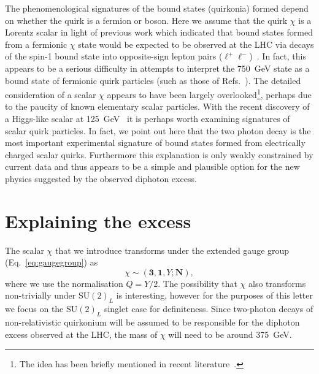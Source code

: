 The phenomenological signatures of the bound states (quirkonia) formed depend on
whether the quirk is a fermion or boson. Here we assume that the quirk $\chi$ is
a Lorentz scalar in light of previous work which indicated that bound states
formed from a fermionic $\chi$ state would be expected to be observed at the LHC
via decays of the spin-1 bound state into opposite-sign lepton pairs
($\ell^+\ell^-$)~\cite{Carlson:1991zn, Clarke:2011aa}. In fact, this appears to
be a serious difficulty in attempts to interpret the \SI{750}{\GeV} state as a
bound state of fermionic quirk particles (such as those of
Refs.~\cite{Kats:2016kuz, Curtin:2015jcv, Kamenik:2016izk}). The detailed
consideration of a scalar $\chi$ appears to have been largely
overlooked\footnote{The idea has been briefly mentioned in recent
  literature~\cite{Agrawal:2015dbf, Ko:2016sht}.}, perhaps due to the paucity of
known elementary scalar particles. With the recent discovery of a Higgs-like
scalar at \SI{125}{\GeV}~\cite{Aad:2012tfa, Chatrchyan:2012ufa} it is perhaps
worth examining signatures of scalar quirk particles. In fact, we point out here
that the two photon decay is the most important experimental signature of bound
states formed from electrically charged scalar quirks. Furthermore this
explanation is only weakly constrained by current data and thus appears to be a
simple and plausible option for the new physics suggested by the observed
diphoton excess.

\section{Explaining the excess}

The scalar $\chi$ that we introduce transforms under the extended gauge group
(Eq.~\ref{eq:gaugegroup}) as
\begin{equation}
  \chi \sim (\mathbf{3}, \mathbf{1}, Y; \mathbf{N}),
\end{equation}
where we use the normalisation $Q=Y/2$. The possibility that $\chi$ also
transforms non-trivially under $\mathrm{SU}(2)_{L}$ is interesting, however for
the purposes of this letter we focus on the $\mathrm{SU}(2)_{L}$ singlet case
for definiteness. Since two-photon decays of non-relativistic quirkonium will be
assumed to be responsible for the diphoton excess observed at the LHC, the mass
of $\chi$ will need to be around \SI{375}{\GeV}.

